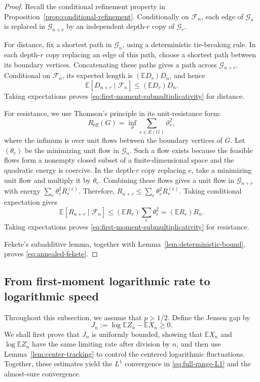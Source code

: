 \documentclass[12pt]{amsart}
\numberwithin{equation}{section}
\theoremstyle{plain}
\theoremstyle{definition}
\newcommand{\E}{\mathbb E}
\begin{document}
\begin{proof}
Recall the conditional refinement property in
Proposition~\ref{prop:conditional-refinement}.  Conditionally on
$\mathcal F_n$, each edge of $\mathcal G_n$ is replaced in
$\mathcal G_{n+r}$ by an independent depth-$r$ copy of $\mathcal G_r$.

For distance, fix a shortest path in $\mathcal G_n$, using a deterministic
tie-breaking rule.  In each depth-$r$ copy replacing an edge of this path,
choose a shortest path between its boundary vertices.  Concatenating these
paths gives a path across $\mathcal G_{n+r}$.  Conditional on $\mathcal F_n$,
its expected length is $(\E D_r)D_n$, and hence
\[
 \E[D_{n+r}\mid\mathcal F_n]\le (\E D_r)D_n.
\]
Taking expectations proves \eqref{eq:first-moment-submultiplicativity} for
distance.

For resistance, we use Thomson's principle in its unit-resistance form:
\[
 R_{\mathrm{eff}}(G)
 =\inf_{\vartheta}\sum_{e\in E(G)}\vartheta_e^2,
\]
where the infimum is over unit flows between the boundary vertices of $G$.  Let
$(\theta_e)$ be the minimizing unit flow in $\mathcal G_n$. Such a flow
exists because the feasible flows form a nonempty closed subset of a
finite-dimensional space and the quadratic energy is coercive. In the
depth-$r$ copy replacing $e$, take a minimizing unit flow
and multiply it by $\theta_e$.
Combining these flows gives a unit flow in $\mathcal G_{n+r}$ with
energy $\sum_e\theta_e^2R_r^{(e)}$.  Therefore,
$R_{n+r}\le\sum_e\theta_e^2R_r^{(e)}$.
Taking conditional expectation gives
\[
 \E[R_{n+r}\mid\mathcal F_n]
 \le (\E R_r)\sum_e\theta_e^2
 = (\E R_r)R_n.
\]
Taking expectations proves \eqref{eq:first-moment-submultiplicativity} for
resistance.

Fekete's subadditive lemma, together with Lemma~\ref{lem:deterministic-bound}, proves
\eqref{eq:annealed-fekete}.
\end{proof}

\subsection{From first-moment logarithmic rate to logarithmic speed}
\label{sec:annealed-to-typical}

Throughout this subsection, we assume that $p>1/2$.  Define the Jensen gap by
\begin{equation}
\label{eq:jensen-gap}
 J_n:=\log\E Z_n-\E X_n\ge0.
\end{equation}
We shall first prove that $J_n$ is uniformly bounded, showing that $\E X_n$
and $\log\E Z_n$ have the same limiting rate after division by $n$, and then
use Lemma~\ref{lem:center-tracking} to control the centered logarithmic
fluctuations.  Together, these estimates yield the $L^1$ convergence in
\eqref{eq:full-range-L1} and the almost-sure convergence.
\end{document}
